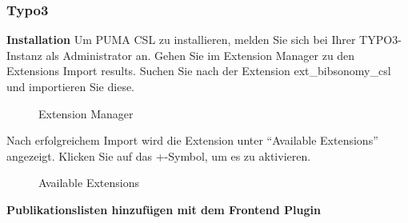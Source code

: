 \subsubsection{Typo3}
\textbf{Installation}\newline\newline
Um PUMA CSL zu installieren, melden Sie sich bei Ihrer TYPO3-Instanz als Administrator an. Gehen Sie im Extension Manager zu den Extensions Import results. Suchen Sie nach der Extension ext\_bibsonomy\_csl und importieren Sie diese.
\begin{figure}[h!]
 \centering
 \caption{Extension Manager}
 \label{figure333}
\end{figure}
Nach erfolgreichem Import wird die Extension unter \enquote{Available Extensions} angezeigt. Klicken Sie auf das +-Symbol, um es zu aktivieren.
\begin{figure}[h!]
 \centering
 \caption{Available Extensions}
 \label{figure222}
\end{figure}
\newline\newline
\textbf{Publikationslisten hinzufügen mit dem Frontend Plugin}\newline\newline
